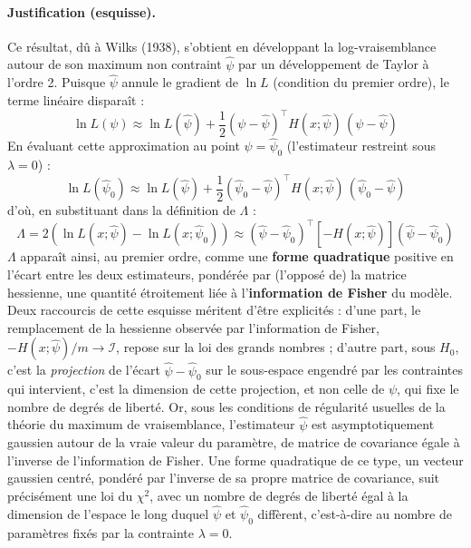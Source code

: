 \documentclass{article}
\begin{document}
\paragraph{Justification (esquisse).} Ce résultat, dû à Wilks (1938), s'obtient en développant la log-vraisemblance autour de son maximum non contraint $\hat{\psi}$ par un développement de Taylor à l'ordre 2. Puisque $\hat{\psi}$ annule le gradient de $\ln L$ (condition du premier ordre), le terme linéaire disparaît :
\begin{equation}
\ln L(\psi) \approx \ln L(\hat{\psi}) + \frac{1}{2}(\psi-\hat{\psi})^\top H(x;\hat{\psi})\,(\psi-\hat{\psi})
\end{equation}
En évaluant cette approximation au point $\psi=\hat{\psi}_0$ (l'estimateur restreint sous $\lambda=0$) :
\begin{equation}
\ln L(\hat{\psi}_0) \approx \ln L(\hat{\psi}) + \frac{1}{2}(\hat{\psi}_0-\hat{\psi})^\top H(x;\hat{\psi})\,(\hat{\psi}_0-\hat{\psi})
\end{equation}
d'où, en substituant dans la définition de $\Lambda$ :
\begin{equation}
\Lambda = 2\left(\ln L(x;\hat{\psi})-\ln L(x;\hat{\psi}_0)\right) \approx (\hat{\psi}-\hat{\psi}_0)^\top \left[-H(x;\hat{\psi})\right] (\hat{\psi}-\hat{\psi}_0)
\end{equation}
$\Lambda$ apparaît ainsi, au premier ordre, comme une \textbf{forme quadratique} positive en l'écart entre les deux estimateurs, pondérée par (l'opposé de) la matrice hessienne, une quantité étroitement liée à l'\textbf{information de Fisher} du modèle. Deux raccourcis de cette esquisse méritent d'être explicités : d'une part, le remplacement de la hessienne observée par l'information de Fisher, $-H(x;\hat\psi)/m\to\mathcal{I}$, repose sur la loi des grands nombres ; d'autre part, sous $H_0$, c'est la \emph{projection} de l'écart $\hat\psi-\hat\psi_0$ sur le sous-espace engendré par les contraintes qui intervient, c'est la dimension de cette projection, et non celle de $\psi$, qui fixe le nombre de degrés de liberté. Or, sous les conditions de régularité usuelles de la théorie du maximum de vraisemblance, l'estimateur $\hat{\psi}$ est asymptotiquement gaussien autour de la vraie valeur du paramètre, de matrice de covariance égale à l'inverse de l'information de Fisher. Une forme quadratique de ce type, un vecteur gaussien centré, pondéré par l'inverse de sa propre matrice de covariance, suit précisément une loi du $\chi^2$, avec un nombre de degrés de liberté égal à la dimension de l'espace le long duquel $\hat{\psi}$ et $\hat{\psi}_0$ diffèrent, c'est-à-dire au nombre de paramètres fixés par la contrainte $\lambda=0$.
\end{document}
